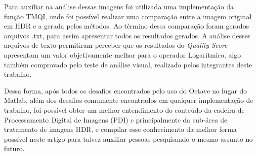 \documentclass[conference]{IEEEtran}
\begin{document}
Para auxiliar na análise dessas imagens foi utilizada uma implementação da função TMQI, onde foi possível realizar uma comparação entre a imagem original em HDR e a gerada pelos métodos. Ao término dessa comparação foram gerados arquivos .txt, para assim apresentar todos os resultados gerados. A análise desses arquivos de texto permitiram perceber que os resultados do \textit{Quality Score} apresentam um valor objetivamente melhor para o operador Logarítmico, algo também comprovado pelo teste de análise visual, realizado pelos integrantes deste trabalho.

Dessa forma, após todos os desafios encontrados pelo uso do Octave no lugar do Matlab, além dos desafios comumente encontrados em qualquer implementação de trabalho, foi possível obter um melhor entendimento do conteúdo da cadeira de Processamento Digital de Imagens (PDI) e principalmente da sub-área de tratamento de imagens HDR, e compilar esse conhecimento da melhor forma possível neste artigo para talvez auxiliar pessoas pesquisando o mesmo assunto no futuro.




\vspace{12pt}
\end{document}
